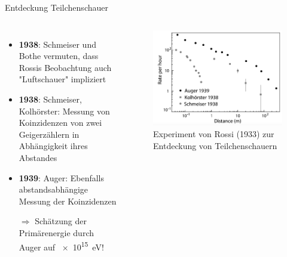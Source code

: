 \documentclass[aspectratio=1610, professionalfonts, 9pt, hyperref={colorlinks=false}]{beamer}
\begin{document}
\begin{frame}{Entdeckung Teilchenschauer}
  \begin{columns}
      \begin{itemize}
        \setlength\itemsep{0.5em}
        \item \textbf{1938}: Schmeiser und Bothe vermuten, dass Rossis Beobachtung auch "Luftschauer" impliziert
        \item \textbf{1938}: Schmeiser, Kolhörster: Messung von Koinzidenzen von zwei Geigerzählern in Abhängigkeit ihres Abstandes
        \item \textbf{1939}: Auger: Ebenfalls abstandsabhängige Messung der Koinzidenzen
        \item[$\Rightarrow$] Schätzung der Primärenergie durch Auger auf \SI{e15}{\electronvolt}!
      \end{itemize}
        \vspace*{10px}
  
      \begin{figure}
          \centering
          \includegraphics[width=\linewidth]{images/auger_messung.png}
          \caption{Experiment von Rossi (1933) zur Entdeckung von Teilchenschauern \cite{9789400754225}}
      \end{figure}
  \end{columns}
\end{frame}
\end{document}
